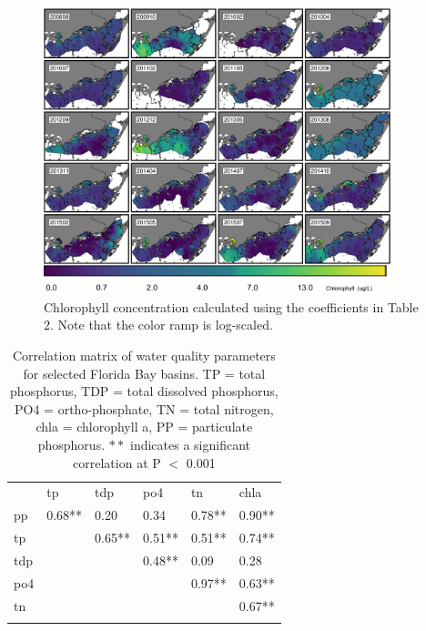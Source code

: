\clearpage

\begin{figure}
  \centering
  \includegraphics[width=0.9\textwidth]{../../figures/multipanel.png}
  \caption{Chlorophyll concentration calculated using the coefficients in Table 2. Note that the color ramp is log-scaled.}
  \label{fig:4}
\end{figure}

\clearpage

\begin{table}
\centering
\caption{Correlation matrix of water quality parameters for selected Florida Bay basins. TP = total phosphorus, TDP = total dissolved phosphorus, PO4 = ortho-phosphate, TN = total nitrogen, chla = chlorophyll a, PP = particulate phosphorus. $**$ indicates a significant correlation at P $<$ 0.001}
\label{tab:1}       %
\begin{tabular}{llllll}
\hline\noalign{\smallskip}
& tp & tdp & po4 & tn & chla \\
\noalign{\smallskip}\hline\noalign{\smallskip}
pp & 0.68** & 0.20 & 0.34 & 0.78** & 0.90** \\ 
tp  &  & 0.65** & 0.51** & 0.51** & 0.74** \\ 
tdp  &  &  & 0.48** & 0.09 & 0.28 \\ 
po4  &  &  &  & 0.97** & 0.63** \\ 
tn  &  &  &  &  & 0.67** \\ 
\noalign{\smallskip}\hline
\end{tabular}
\end{table}

